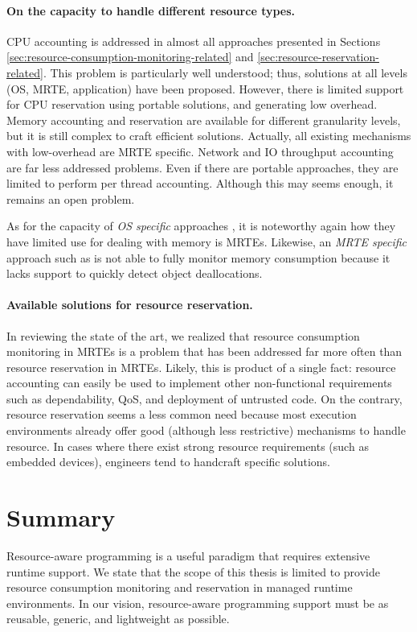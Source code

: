 \paragraph{On the capacity to handle different resource types.}
CPU accounting is addressed in almost all approaches presented in Sections \ref{sec:resource-consumption-monitoring-related} and \ref{sec:resource-reservation-related}.
This problem is particularly well understood; thus, solutions at all levels (OS, MRTE, application) have been proposed.
However, there is limited support for CPU reservation using portable solutions, and generating low overhead.
Memory accounting and reservation are available for different granularity levels, but it is still complex to craft efficient solutions.
Actually, all existing mechanisms with low-overhead are MRTE specific.
Network and IO throughput accounting are far less addressed problems.
Even if there are portable approaches, they are limited to perform per thread accounting.
Although this may seems enough, it remains an open problem.

As for the capacity of \textit{OS specific} approaches \cite{Banga:1999:RCN:296806.296810,Kamp00jails:confining, Soltesz:2007:COS:1272998.1273025}, it is noteworthy again how they have limited use for dealing with memory is MRTEs.
Likewise, an \textit{MRTE specific} approach such as \cite{Lengauer:2015:AEO:2668930.2688037} is not able to fully monitor memory consumption because it lacks support to quickly detect object deallocations.

\paragraph{Available solutions for resource reservation.}
In reviewing the state of the art, we realized that resource consumption monitoring in MRTEs is a problem that has been addressed far more often than resource reservation in MRTEs.
Likely, this is product of a single fact: resource accounting can easily be used to implement other non-functional requirements such as dependability, QoS, and deployment of untrusted code.
On the contrary, resource reservation seems a less common need because most execution environments already offer good (although less restrictive) mechanisms to handle resource.
In cases where there exist strong resource requirements (such as embedded devices), engineers tend to handcraft specific solutions.


\section{Summary}
Resource-aware programming is a useful paradigm that requires extensive runtime support.
We state that the scope of this thesis is limited to provide resource consumption monitoring and reservation in managed runtime environments.
In our vision, resource-aware programming support must be as reusable, generic, and lightweight as possible.


